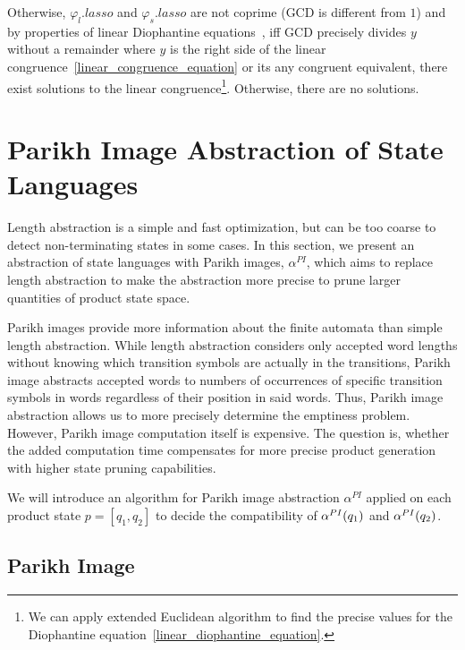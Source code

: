Otherwise, $\varphi_l.lasso$ and $\varphi_s.lasso$ are not coprime (GCD is different from $1$) and by properties of linear Diophantine equations~\cite{LinearCongruences}, iff GCD precisely divides $y$ without a remainder where $y$ is the right side of the linear congruence~\ref{linear_congruence_equation} or its any congruent equivalent, there exist solutions to the linear congruence\footnote{We can apply extended Euclidean algorithm to find the precise values for the Diophantine equation~\ref{linear_diophantine_equation}.}. Otherwise, there are no solutions.

\section{Parikh Image Abstraction of State Languages}

Length abstraction is a simple and fast optimization, but can be too coarse to detect non-terminating states in some cases. In this section, we present an abstraction of state languages with Parikh images, $\alpha^{PI}$, which aims to replace length abstraction to make the abstraction more precise to prune larger quantities of product state space.

Parikh images provide more information about the finite automata than simple length abstraction. While length abstraction considers only accepted word lengths without knowing which transition symbols are actually in the transitions, Parikh image abstracts accepted words to numbers of occurrences of specific transition symbols in words regardless of their position in said words. Thus, Parikh image abstraction allows us to more precisely determine the emptiness problem. However, Parikh image computation itself is expensive. The question is, whether the added computation time compensates for more precise product generation with higher state pruning capabilities.

We will introduce an algorithm for Parikh image abstraction $\alpha^{PI}$ applied on each product state $p = [q_1, q_2]$ to decide the compatibility of $\alpha^{PI}(q_1)$ and $\alpha^{PI}(q_2)$.

\subsection{Parikh Image} \label{sec:parikhImage}

